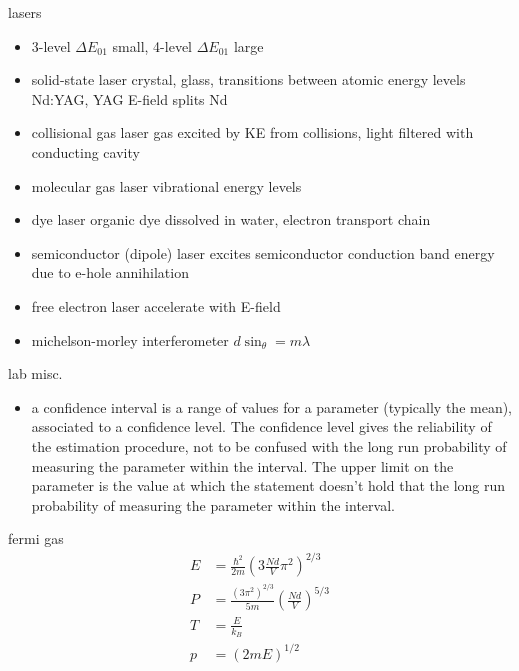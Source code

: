 \documentclass[avery5388, frame]{flashcards}
\begin{document}
\begin{flashcard}{lasers}
  {
    \begin{itemize}
    \item 3-level $\Delta E_{01}$ small, 4-level $\Delta E_{01}$ large
    \item solid-state laser
      \subitem crystal, glass, transitions between atomic energy levels Nd:YAG, YAG E-field splits Nd
    \item collisional gas laser
      \subitem gas excited by KE from collisions, light filtered with conducting cavity
    \item molecular gas laser
      \subitem vibrational energy levels
    \item dye laser
      \subitem organic dye dissolved in water, electron transport chain
    \item semiconductor (dipole) laser
      \subitem excites semiconductor conduction band energy due to e-hole annihilation
    \item free electron laser
      \subitem accelerate with E-field
    \item michelson-morley interferometer $d \sin_{\theta} = m \lambda$
    \end{itemize}
  }
\end{flashcard}

\begin{flashcard}{lab misc.}
  {
    \begin{itemize}
    \item a confidence interval is a range of values for a parameter (typically the mean),
      associated to a confidence level. The confidence level gives the reliability of the estimation
      procedure, not to be confused with the long run probability of measuring the parameter
      within the interval. The upper limit on the parameter is the value
      at which the statement doesn't hold that the long run probability of measuring the parameter
      within the interval.
    \end{itemize}
  }
\end{flashcard}


\begin{flashcard}{fermi gas}
  {
    \begin{align*}
      E &= \frac{\hbar^{2}}{2m}(3 \frac{Nd}{V} \pi^{2})^{2/3}\\
      P &= \frac{(3\pi^{2})^{2/3}}{5m}(\frac{Nd}{V})^{5/3}\\
      T &= \frac{E}{k_{B}}\\
      p &= (2mE)^{1/2}
    \end{align*}
  }
\end{flashcard}
\end{document}
